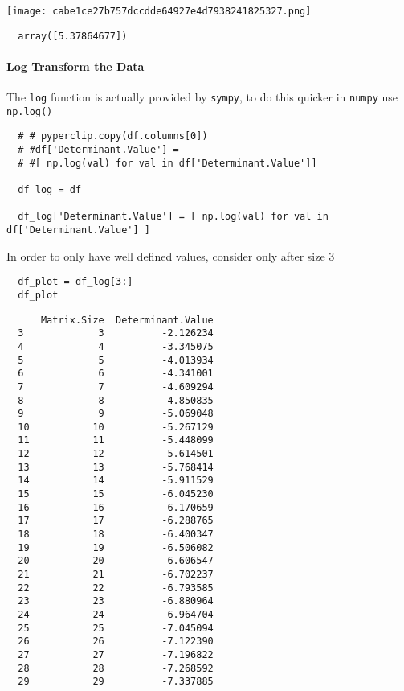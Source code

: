 \documentclass[11pt]{article}
\begin{document}
\begin{center}
\texttt{[image: cabe1ce27b757dccdde64927e4d7938241825327.png]}
\end{center}

\begin{verbatim}
  array([5.37864677])
\end{verbatim}

\paragraph{Log Transform the Data}
\label{log-transform-the-data}
The \texttt{log} function is actually provided by \texttt{sympy}, to do this quicker
in \texttt{numpy} use \texttt{np.log()}

\begin{verbatim}
  # # pyperclip.copy(df.columns[0])
  # #df['Determinant.Value'] =
  # #[ np.log(val) for val in df['Determinant.Value']]

  df_log = df

  df_log['Determinant.Value'] = [ np.log(val) for val in df['Determinant.Value'] ]

\end{verbatim}

In order to only have well defined values, consider only after size 3

\begin{verbatim}
  df_plot = df_log[3:]
  df_plot
\end{verbatim}

\begin{verbatim}
      Matrix.Size  Determinant.Value
  3             3          -2.126234
  4             4          -3.345075
  5             5          -4.013934
  6             6          -4.341001
  7             7          -4.609294
  8             8          -4.850835
  9             9          -5.069048
  10           10          -5.267129
  11           11          -5.448099
  12           12          -5.614501
  13           13          -5.768414
  14           14          -5.911529
  15           15          -6.045230
  16           16          -6.170659
  17           17          -6.288765
  18           18          -6.400347
  19           19          -6.506082
  20           20          -6.606547
  21           21          -6.702237
  22           22          -6.793585
  23           23          -6.880964
  24           24          -6.964704
  25           25          -7.045094
  26           26          -7.122390
  27           27          -7.196822
  28           28          -7.268592
  29           29          -7.337885
\end{verbatim}
\end{document}
